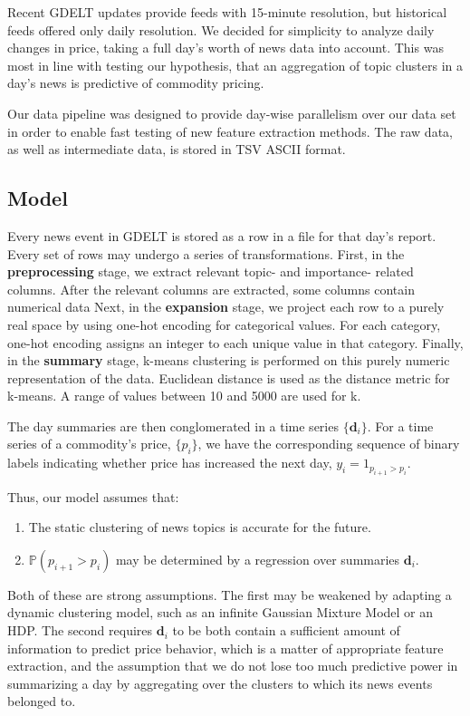 Recent GDELT updates provide feeds with 15-minute resolution, but historical feeds offered only daily resolution. We decided for simplicity to analyze daily changes in price, taking a full day's worth of news data into account. This was most in line with testing our hypothesis, that an aggregation of topic clusters in a day's news is predictive of commodity pricing.

Our data pipeline was designed to provide day-wise parallelism over our data set in order to enable fast testing of new feature extraction methods. The raw data, as well as intermediate data, is stored in TSV ASCII format.

\subsection{Model}

Every news event in GDELT is stored as a row in a file for that day's report. Every set of rows may undergo a series of transformations. First, in the \textbf{preprocessing} stage, we extract relevant topic- and importance- related columns. After the relevant columns are extracted, some columns contain numerical data Next, in the \textbf{expansion} stage, we project each row to a purely real space by using one-hot encoding for categorical values. For each category, one-hot encoding assigns an integer to each unique value in that category. Finally, in the \textbf{summary} stage, k-means clustering is performed on this purely numeric representation of the data. Euclidean distance is used as the distance metric for k-means. A range of values between 10 and 5000 are used for k.

The day summaries are then conglomerated in a time series $\{\textbf{d}_i\}$. For a time series of a commodity's price, $\{p_i\}$, we have the corresponding sequence of binary labels indicating whether price has increased the next day, $y_i=1_{p_{i+1}>p_i}$.

Thus, our model assumes that:
\begin{enumerate}
\item The static clustering of news topics is accurate for the future.
\item $\mathbb{P}(p_{i+1}>p_i)$ may be determined by a regression over summaries $\textbf{d}_i$. 
\end{enumerate}

Both of these are strong assumptions. The first may be weakened by adapting a dynamic clustering model, such as an infinite Gaussian Mixture Model or an HDP. The second requires $\textbf{d}_i$ to be both contain a sufficient amount of information to predict price behavior, which is a matter of appropriate feature extraction, and the assumption that we do not lose too much predictive power in summarizing a day by aggregating over the clusters to which its news events belonged to.


